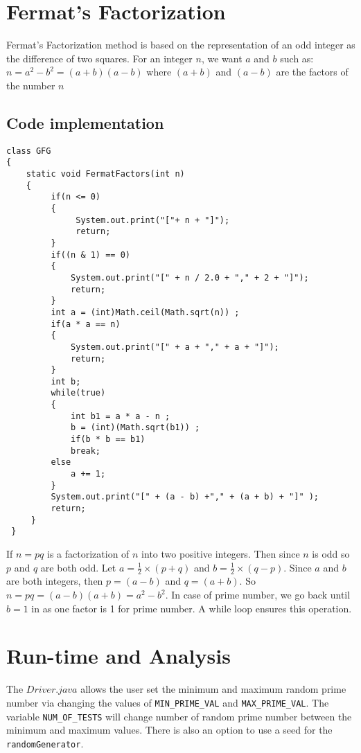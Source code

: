 \documentclass[]{article}
\begin{document}
\section{Fermat's Factorization}
Fermat's Factorization method is based on the representation of an odd integer as the difference of two squares. For an integer $n$, we want $a$ and $b$ such as: $n=a^2-b^2=(a+b)(a-b)$ where $(a+b)$ and $(a-b)$ are the factors of the number $n$
\subsection{Code implementation}
\begin{lstlisting}[basicstyle=\small]
class GFG  
{ 
    static void FermatFactors(int n) 
    { 
         if(n <= 0) 
         { 
              System.out.print("["+ n + "]"); 
              return; 
         } 
         if((n & 1) == 0) 
         { 
             System.out.print("[" + n / 2.0 + "," + 2 + "]");  
             return; 
         } 
         int a = (int)Math.ceil(Math.sqrt(n)) ;  
         if(a * a == n)
         { 
             System.out.print("[" + a + "," + a + "]");  
             return; 	
         } 
         int b; 
         while(true) 
         { 
             int b1 = a * a - n ; 
             b = (int)(Math.sqrt(b1)) ; 
             if(b * b == b1) 
             break; 
         else
             a += 1; 
         } 
         System.out.print("[" + (a - b) +"," + (a + b) + "]" );  
         return; 
     }
 }
\end{lstlisting}
If $n=pq$ is a factorization of $n$ into two positive integers. Then since $n$ is odd so $p$ and $q$ are both odd. Let $a=\frac{1}{2}\times(p+q)$ and $b=\frac{1}{2}\times(q-p)$. Since $a$ and $b$ are both integers, then $p=(a-b)$ and $q=(a+b)$. So $n=pq=(a-b)(a+b)=a^2-b^2$. In case of prime number, we go back until $b=1$ in as one factor is 1 for prime number. A while loop ensures this operation. 
\section{Run-time and Analysis}
The $Driver.java$ allows the user set the minimum and maximum random prime number via changing the values of \lstinline|MIN_PRIME_VAL| and \lstinline|MAX_PRIME_VAL|. The variable \lstinline|NUM_OF_TESTS| will change number of random prime number between the minimum and maximum values. There is also an option to use a seed for the \lstinline|randomGenerator|.
\end{document}
